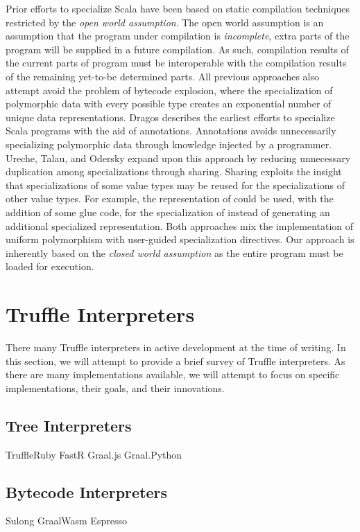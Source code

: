 Prior efforts to specialize Scala have been based on static compilation techniques restricted by the \textit{open world assumption}.
The open world assumption is an assumption that the program under compilation is \textit{incomplete}, extra parts of the program will be supplied in a future compilation.
As such, compilation results of the current parts of program must be interoperable with the compilation results of the remaining yet-to-be determined parts.
All previous approaches also attempt avoid the problem of bytecode explosion, where the specialization of polymorphic data with every possible type creates an exponential number of unique data representations.
Dragos describes the earliest efforts to specialize Scala programs with the aid of annotations\cite{scala:specialization}.
Annotations avoids unnecessarily specializing polymorphic data through knowledge injected by a programmer.
Ureche, Talau, and Odersky expand upon this approach by reducing unnecessary duplication among specializations through sharing\cite{scala:miniboxing}.
Sharing exploits the insight that specializations of some value types may be reused for the specializations of other value types.
For example, the representation of  could be used, with the addition of some glue code, for the specialization of  instead of generating an additional specialized representation. 
Both approaches mix the implementation of uniform polymorphism with user-guided specialization directives.
Our approach is inherently based on the \textit{closed world assumption} as the entire program must be loaded for execution.

\section{Truffle Interpreters}

There many Truffle interpreters in active development at the time of writing.
In this section, we will attempt to provide a brief survey of Truffle interpreters.
As there are many implementations available, we will attempt to focus on specific implementations, their goals, and their innovations.

\subsection{Tree Interpreters}

TruffleRuby
FastR
Graal.js
Graal.Python

\subsection{Bytecode Interpreters}

Sulong
GraalWasm
Espresso
